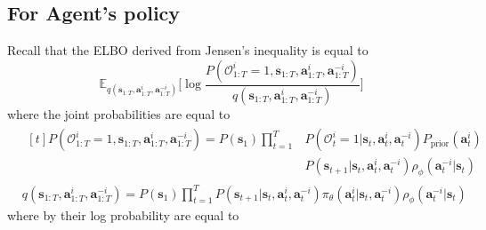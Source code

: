 \label{ELBO:agent}
\subsection{For Agent's policy}
Recall that the ELBO derived from Jensen's inequality is equal to 
\begin{equation}
    \mathbb{E}_{q(\boldsymbol{s}_{1:T}, \boldsymbol{a}^i_{1:T}, \boldsymbol{a}^{-i}_{1:T})}\Bigg[ \log \frac{P(\mathcal{O}^i_{1:T} = 1, \boldsymbol{s}_{1:T}, \boldsymbol{a}^i_{1:T}, \boldsymbol{a}^{-i}_{1:T})}{q(\boldsymbol{s}_{1:T}, \boldsymbol{a}^i_{1:T}, \boldsymbol{a}^{-i}_{1:T})} \Bigg]
\end{equation}
where the joint probabilities are equal to 
\begin{equation}
    \begin{aligned}
        &\begin{aligned}[t]
            P(\mathcal{O}^i_{1:T} = 1, \boldsymbol{s}_{1:T}, \boldsymbol{a}^i_{1:T}, \boldsymbol{a}^{-i}_{1:T}) = P(\boldsymbol{s}_1) \prod^T_{t=1} &P(\mathcal{O}^i_{t} = 1 | \boldsymbol{s}_{t}, \boldsymbol{a}^i_{t}, \boldsymbol{a}^{-i}_{t}) P_{\text{prior}}(\boldsymbol{a}^i_t) \\
            &P(\boldsymbol{s}_{t+1} | \boldsymbol{s}_{t}, \boldsymbol{a}^i_{t}, \boldsymbol{a}^{-i}_{t})  \rho_{\phi}(\boldsymbol{a}^{-i}_t | \boldsymbol{s}_t)
        \end{aligned}\\
        &q(\boldsymbol{s}_{1:T}, \boldsymbol{a}^i_{1:T}, \boldsymbol{a}^{-i}_{1:T}) = P(\boldsymbol{s}_1) \prod^T_{t=1}
        P(\boldsymbol{s}_{t+1} | \boldsymbol{s}_{t}, \boldsymbol{a}^i_{t}, \boldsymbol{a}^{-i}_{t}) \pi_{\theta}(\boldsymbol{a}^i_t | \boldsymbol{s}_t, \boldsymbol{a}^{-i}_t) \rho_{\phi}(\boldsymbol{a}^{-i}_t | \boldsymbol{s}_t)
    \end{aligned}
\end{equation}
where by their log probability are equal to 
